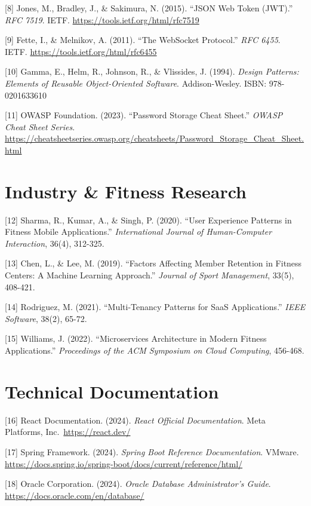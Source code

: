 \documentclass[
  12pt,
  a4paperpaper,
]{report}
\begin{document}
{[}8{]} Jones, M., Bradley, J., \& Sakimura, N. (2015). ``JSON Web Token
(JWT).'' \emph{RFC 7519}. IETF. \url{https://tools.ietf.org/html/rfc7519}

{[}9{]} Fette, I., \& Melnikov, A. (2011). ``The WebSocket Protocol.''
\emph{RFC 6455}. IETF. \url{https://tools.ietf.org/html/rfc6455}

{[}10{]} Gamma, E., Helm, R., Johnson, R., \& Vlissides, J. (1994).
\emph{Design Patterns: Elements of Reusable Object-Oriented Software}.
Addison-Wesley. ISBN: 978-0201633610

{[}11{]} OWASP Foundation. (2023). ``Password Storage Cheat Sheet.''
\emph{OWASP Cheat Sheet Series}.
\url{https://cheatsheetseries.owasp.org/cheatsheets/Password_Storage_Cheat_Sheet.html}


\section{Industry \& Fitness Research}\label{industry-fitness-research}

{[}12{]} Sharma, R., Kumar, A., \& Singh, P. (2020). ``User Experience
Patterns in Fitness Mobile Applications.'' \emph{International Journal
of Human-Computer Interaction}, 36(4), 312-325.

{[}13{]} Chen, L., \& Lee, M. (2019). ``Factors Affecting Member
Retention in Fitness Centers: A Machine Learning Approach.''
\emph{Journal of Sport Management}, 33(5), 408-421.

{[}14{]} Rodriguez, M. (2021). ``Multi-Tenancy Patterns for SaaS
Applications.'' \emph{IEEE Software}, 38(2), 65-72.

{[}15{]} Williams, J. (2022). ``Microservices Architecture in Modern
Fitness Applications.'' \emph{Proceedings of the ACM Symposium on Cloud
Computing}, 456-468.


\section{Technical Documentation}\label{technical-documentation}

{[}16{]} React Documentation. (2024). \emph{React Official
Documentation}. Meta Platforms, Inc.~\url{https://react.dev/}

{[}17{]} Spring Framework. (2024). \emph{Spring Boot Reference
Documentation}. VMware.
\url{https://docs.spring.io/spring-boot/docs/current/reference/html/}

{[}18{]} Oracle Corporation. (2024). \emph{Oracle Database
Administrator's Guide}. \url{https://docs.oracle.com/en/database/}
\end{document}
